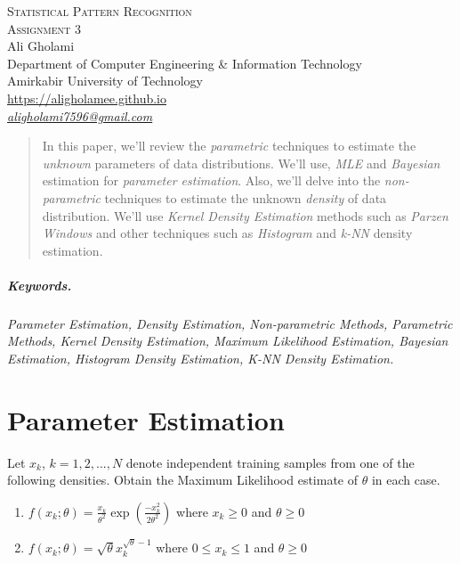 \documentclass[12pt]{article}
\numberwithin{equation}{section}
\numberwithin{table}{section}
\numberwithin{figure}{section}
\begin{document}

\begin{center}
\textsc{\Large Statistical Pattern Recognition} \\[2pt]
	\textsc{\large Assignment 3}\\
	\vspace{0.5cm}
  Ali Gholami \\[6pt]
  Department of Computer Engineering \& Information Technology\\
  Amirkabir University of Technology  \\[6pt]
  \def\UrlFont{\em}
  \url{https://aligholamee.github.io}\\
    \href{mailto:aligholami7596@gmail.com}{\textit{aligholami7596@gmail.com}}
\end{center}

\begin{abstract}
In this paper, we'll review the \textit{parametric} techniques to estimate the \textit{unknown} parameters of data distributions. We'll use, \textit{MLE} and \textit{Bayesian} estimation for \textit{parameter estimation}. Also, we'll delve into the \textit{non-parametric} techniques to estimate the unknown \textit{density} of data distribution. We'll use \textit{Kernel Density Estimation} methods such as \textit{Parzen Windows} and other techniques such as \textit{Histogram} and \textit{k-NN} density estimation.
\end{abstract}

\subparagraph{Keywords.} \textit{Parameter Estimation, Density Estimation, Non-parametric Methods, Parametric Methods, Kernel Density Estimation, Maximum Likelihood Estimation, Bayesian Estimation, Histogram Density Estimation, K-NN Density Estimation.}

\section{Parameter Estimation}
Let ${x_k}$, $k = 1, 2, ..., N$ denote independent training samples from one of the following densities. Obtain the Maximum Likelihood estimate of $\theta$ in each case.
\begin{enumerate}[label=(\alph*)]
	\item $ f(x_k;\theta) = \frac{x_k}{\theta^2}\exp(\frac{-x_k^2}{2\theta^2}) $ where $x_k \geq 0$ and $\theta \ge 0$
	\item $ f(x_k;\theta) = \sqrt{\theta}x_k^{\sqrt{\theta} - 1}$ where $0 \leq x_k \leq 1$ and $ \theta \ge 0$
\end{enumerate}
\end{document}
